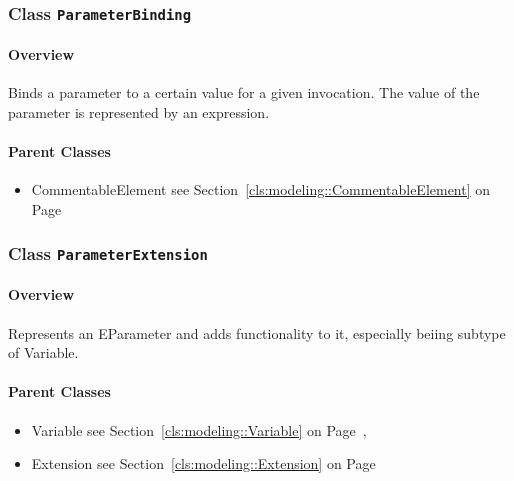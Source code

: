 \subsubsection{\Large{Class \bfseries \texttt{ParameterBinding}\normalfont}}
\label{cls:modeling::calls::ParameterBinding} 
\paragraph{Overview}

	
			
Binds a parameter to a certain value for a given invocation. The value of the parameter is represented by an expression.	
		
	



\paragraph{Parent Classes}
\begin{itemize}
\item CommentableElement see Section~\ref{cls:modeling::CommentableElement} on Page~\pageref{cls:modeling::CommentableElement}\end{itemize}
\subsubsection{\Large{Class \bfseries \texttt{ParameterExtension}\normalfont}}
\label{cls:modeling::calls::ParameterExtension} 
\paragraph{Overview}

	
			
Represents an EParameter and adds functionality to it, especially beiing subtype of Variable.	
		
	



\paragraph{Parent Classes}
\begin{itemize}
\item Variable see Section~\ref{cls:modeling::Variable} on Page~\pageref{cls:modeling::Variable}, \item Extension see Section~\ref{cls:modeling::Extension} on Page~\pageref{cls:modeling::Extension}\end{itemize}
\newpage
		


